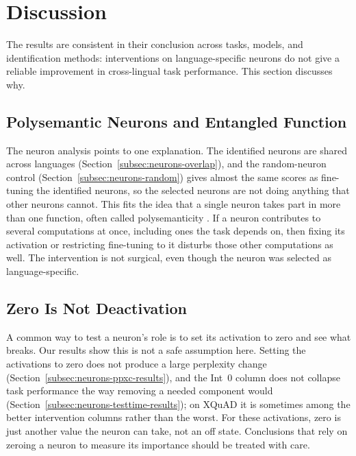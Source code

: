 \section{Discussion}
\label{sec:neurons-discussion}

The results are consistent in their conclusion across tasks, models, and
identification methods: interventions on language-specific neurons do not give a
reliable improvement in cross-lingual task performance. This section discusses why.

\subsection{Polysemantic Neurons and Entangled Function}
\label{subsec:neurons-polysemantic}

The neuron analysis points to one explanation. The identified neurons are shared
across languages (Section~\ref{subsec:neurons-overlap}), and the random-neuron
control (Section~\ref{subsec:neurons-random}) gives almost the same scores as
fine-tuning the identified neurons, so the selected neurons are not doing anything
that other neurons cannot. This fits the idea that a single neuron takes part in
more than one function, often called polysemanticity
\citep{elhage2022superposition}. If a neuron contributes to several computations at
once, including ones the task depends on, then fixing its activation or restricting
fine-tuning to it disturbs those other computations as well. The intervention is
not surgical, even though the neuron was selected as language-specific.

\subsection{Zero Is Not Deactivation}
\label{subsec:neurons-zero}

A common way to test a neuron's role is to set its activation to zero and see what
breaks. Our results show this is not a safe assumption here. Setting the activations
to zero does not produce a large perplexity change
(Section~\ref{subsec:neurons-ppxc-results}), and the Int~0 column does not collapse
task performance the way removing a needed component would
(Section~\ref{subsec:neurons-testtime-results}); on XQuAD it is sometimes among the
better intervention columns rather than the worst. For these activations, zero is
just another value the neuron can take, not an off state. Conclusions that rely on
zeroing a neuron to measure its importance should be treated with care.


